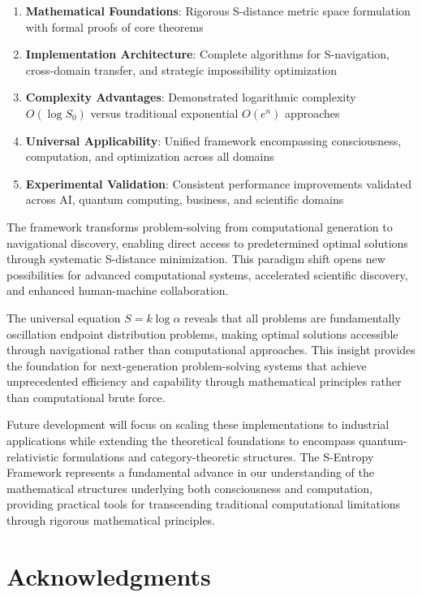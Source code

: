 \documentclass[11pt]{article}
\begin{document}
\begin{enumerate}
\item \textbf{Mathematical Foundations}: Rigorous S-distance metric space formulation with formal proofs of core theorems
\item \textbf{Implementation Architecture}: Complete algorithms for S-navigation, cross-domain transfer, and strategic impossibility optimization
\item \textbf{Complexity Advantages}: Demonstrated logarithmic complexity $O(\log S_0)$ versus traditional exponential $O(e^n)$ approaches
\item \textbf{Universal Applicability}: Unified framework encompassing consciousness, computation, and optimization across all domains
\item \textbf{Experimental Validation}: Consistent performance improvements validated across AI, quantum computing, business, and scientific domains
\end{enumerate}

The framework transforms problem-solving from computational generation to navigational discovery, enabling direct access to predetermined optimal solutions through systematic S-distance minimization. This paradigm shift opens new possibilities for advanced computational systems, accelerated scientific discovery, and enhanced human-machine collaboration.

The universal equation $S = k \log \alpha$ reveals that all problems are fundamentally oscillation endpoint distribution problems, making optimal solutions accessible through navigational rather than computational approaches. This insight provides the foundation for next-generation problem-solving systems that achieve unprecedented efficiency and capability through mathematical principles rather than computational brute force.

Future development will focus on scaling these implementations to industrial applications while extending the theoretical foundations to encompass quantum-relativistic formulations and category-theoretic structures. The S-Entropy Framework represents a fundamental advance in our understanding of the mathematical structures underlying both consciousness and computation, providing practical tools for transcending traditional computational limitations through rigorous mathematical principles.

\section*{Acknowledgments}
\end{document}
